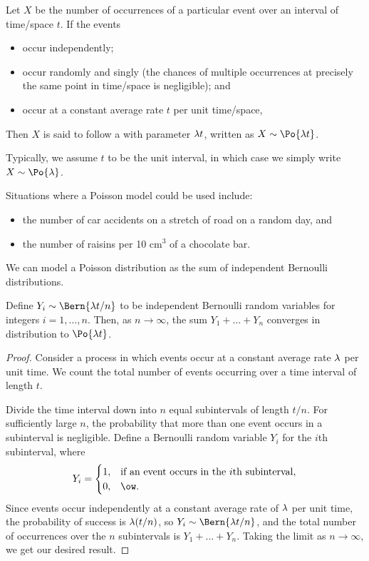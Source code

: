 \begin{definition}
    Let $X$ be the number of occurrences of a particular event over an interval of time/space $t$. If the events
    \begin{itemize}
        \item occur independently;
        \item occur randomly and singly (the chances of multiple occurrences at precisely the same point in time/space is negligible); and
        \item occur at a constant average rate $t$ per unit time/space,
    \end{itemize}
    Then $X$ is said to follow a  with parameter $\lambda t$, written as $X \sim \Po{\l t}$.
\end{definition}
\begin{remark}
    Typically, we assume $t$ to be the unit interval, in which case we simply write $X \sim \Po{\l}$.
\end{remark}

Situations where a Poisson model could be used include:
\begin{itemize}
    \item the number of car accidents on a stretch of road on a random day, and
    \item the number of raisins per 10 cm$^3$ of a chocolate bar.
\end{itemize}

We can model a Poisson distribution as the sum of independent Bernoulli distributions.

\begin{proposition}
    Define $Y_i \sim \Bern{\l t / n}$ to be independent Bernoulli random variables for integers $i = 1, \dots, n$. Then, as $n \to \infty$, the sum $Y_1 + \dots + Y_n$ converges in distribution to $\Po{\l t}$.
\end{proposition}
\begin{proof}
    Consider a process in which events occur at a constant average rate $\lambda$ per unit time. We count the total number of events occurring over a time interval of length $t$.

    Divide the time interval down into $n$ equal subintervals of length $t/n$. For sufficiently large $n$, the probability that more than one event occurs in a subinterval is negligible. Define a Bernoulli random variable $Y_i$ for the $i$th subinterval, where
    \[Y_i = \begin{cases}1, & \text{if an event occurs in the $i$th subinterval}, \\ 0, & \ow.\end{cases}\] Since events occur independently at a constant average rate of $\lambda$ per unit time, the probability of success is $\lambda (t/n)$, so $Y_i \sim \Bern{\l t / n}$, and the total number of occurrences over the $n$ subintervals is $Y_1 + \dots + Y_n$. Taking the limit as $n \to \infty$, we get our desired result.
\end{proof}

